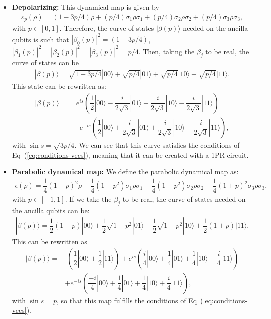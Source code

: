 \documentclass[10pt,letterpaper]{article} %
\newcommand{\eref}[1]{Eq~(\ref{#1})}
\begin{document}
\begin{itemize}
\item \textbf{Depolarizing:} This dynamical map is given by
\begin{align*}
\varepsilon_p(\rho) = (1-3p/4) \rho + (p/4) \sigma_1 \rho \sigma_1 + (p/4) \sigma_2 \rho \sigma_2 + (p/4) \sigma_3 \rho \sigma_3,
\end{align*}
with $p \in [0,1]$. 
Therefore, the curve of states $|\beta(p)\rangle$ needed on the ancilla
qubits is such that ${|\beta_0(p)|}^2= (1-3p/4)$, ${|\beta_1(p)|}^2 =
{|\beta_2(p)|}^2 = {|\beta_3(p)|}^2 = p/4$.  Then, taking the $\beta_j$ to be
real, the curve of states can be 
\begin{align*}
|\beta(p) \rangle = \sqrt{1-3p/4} |00\rangle + \sqrt{p/4} |01\rangle + \sqrt{p/4} |10 \rangle  + \sqrt{p/4} |11\rangle.
\end{align*}
This state can be rewritten as:
\begin{align*}
|\beta(p)\rangle =& \; e^{is} \left( \dfrac{1}{2} |00\rangle - \dfrac{i}{2\sqrt{3}} |01\rangle 
      - \dfrac{i}{2\sqrt{3}} |10 \rangle - \dfrac{i}{2\sqrt{3}} |11\rangle \right) \\
& + e^{-is} \left( \dfrac{1}{2} |00\rangle + \dfrac{i}{2\sqrt{3}} |01\rangle 
      + \dfrac{i}{2\sqrt{3}} |10\rangle + \dfrac{i}{2\sqrt{3}} |11 \rangle \right),
\end{align*}
with $\sin s = \sqrt{3p/4}$.
We can see that this curve satisfies the conditions of \eref{eq:conditions-vecs}, meaning that it can be created with a 
1PR circuit.

\item \textbf{Parabolic dynamical map:} We define the parabolic dynamical map as:
\begin{eqnarray}
\epsilon(\rho) = \dfrac{1}{4} {(1-p)}^2  \rho + \dfrac{1}{4} (1-p^2) \sigma_1 \rho \sigma_1 + \dfrac{1}{4} (1-p^2) \sigma_2 \rho \sigma_2 + \dfrac{1}{4} {(1+p)}^2 \sigma_3 \rho \sigma_3,
\label{eq:parab}
\end{eqnarray}
with $p \in [-1,1]$. 
If we take the $\beta_j$ to be real,
the curve of states needed on the ancilla qubits can be:
\begin{eqnarray}
|\beta(p)\rangle = \dfrac{1}{2} (1-p) |00\rangle + \dfrac{1}{2} \sqrt{1-p^2} |01\rangle +  \dfrac{1}{2} \sqrt{1-p^2} |10\rangle +  \dfrac{1}{2}(1+p) |11\rangle.
\end{eqnarray}
This can be rewritten as
\begin{align*}
|\beta(p)\rangle =&\; \left( \dfrac{1}{2}|00\rangle + \dfrac{1}{2} |11\rangle \right) + e^{is} \left( \dfrac{i}{4}|00\rangle + \dfrac{1}{4} |01\rangle + \dfrac{1}{4} |10\rangle - \dfrac{i}{4} |11\rangle \right) \\
& + e^{-is}  \left( \dfrac{-i}{4} |00\rangle + \dfrac{1}{4} |01\rangle + \dfrac{1}{4} |10\rangle + \dfrac{i}{4} |11\rangle \right),
\end{align*}
with $\sin s = p$, so that
this map fulfills the conditions of  \eref{eq:conditions-vecs}.



\end{itemize}
\end{document}
